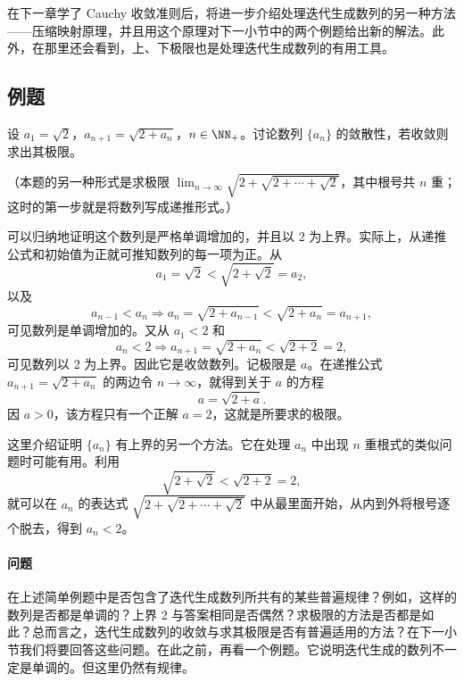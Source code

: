 在下一章学了 Cauchy 收敛准则后，将进一步介绍处理迭代生成数列的另一种方法——压缩映射原理，并且用这个原理对下一小节中的两个例题给出新的解法。此外，在那里还会看到，上、下极限也是处理迭代生成数列的有用工具。

\subsection{例题}

\begin{xexample}[2.6.1]
设 $a_1=\sqrt2$，$a_{n+1}=\sqrt{2+a_n}$，$n\in\NN_+$。讨论数列 $\{a_n\}$ 的敛散性，若收敛则求出其极限。

（本题的另一种形式是求极限 $\displaystyle\lim_{n\to\infty}\sqrt{2+\sqrt{2+\cdots+\sqrt2}}$，其中根号共 $n$ 重；这时的第一步就是将数列写成递推形式。）
\end{xexample}
\begin{xsolution}
可以归纳地证明这个数列是严格单调增加的，并且以 2 为上界。实际上，从递推公式和初始值为正就可推知数列的每一项为正。从
\[
  a_1=\sqrt2<\sqrt{2+\sqrt2}=a_2,
\]
以及
\[
  a_{n-1}<a_n\Longrightarrow
  a_n=\sqrt{2+a_{n-1}}<\sqrt{2+a_n}=a_{n+1},
\]
可见数列是单调增加的。又从 $a_1<2$ 和
\[
  a_n<2\Longrightarrow a_{n+1}=\sqrt{2+a_n}<\sqrt{2+2}=2,
\]
可见数列以 2 为上界。因此它是收敛数列。记极限是 $a$。在递推公式 $a_{n+1}=\sqrt{2+a_n}$ 的两边令 $n\to\infty$，就得到关于 $a$ 的方程
\[
  a=\sqrt{2+a}.
\]
因 $a>0$，该方程只有一个正解 $a=2$，这就是所要求的极限。
\end{xsolution}

\begin{xremark}
这里介绍证明 $\{a_n\}$ 有上界的另一个方法。它在处理 $a_n$ 中出现 $n$ 重根式的类似问题时可能有用。利用
\[
  \sqrt{2+\sqrt2}<\sqrt{2+2}=2,
\]
就可以在 $a_n$ 的表达式 $\sqrt{2+\sqrt{2+\cdots+\sqrt2}}$ 中从最里面开始，从内到外将根号逐个脱去，得到 $a_n<2$。
\end{xremark}

\paragraph{问题}
在上述简单例题中是否包含了迭代生成数列所共有的某些普遍规律？例如，这样的数列是否都是单调的？上界 2 与答案相同是否偶然？求极限的方法是否都是如此？总而言之，迭代生成数列的收敛与求其极限是否有普遍适用的方法？在下一小节我们将要回答这些问题。在此之前，再看一个例题。它说明迭代生成的数列不一定是单调的。但这里仍然有规律。

